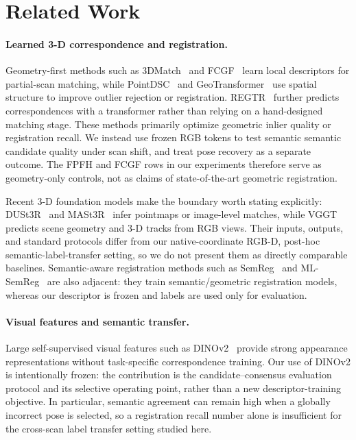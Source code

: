 \documentclass[10pt,twocolumn]{article}
\begin{document}
\section{Related Work}

\paragraph{Learned 3-D correspondence and registration.}
Geometry-first methods such as 3DMatch~\cite{3dmatch} and FCGF~\cite{fcgf}
learn local descriptors for partial-scan matching, while PointDSC~\cite{pointdsc}
and GeoTransformer~\cite{geotransformer} use spatial structure to improve
outlier rejection or registration. REGTR~\cite{regtr} further predicts
correspondences with a transformer rather than relying on a hand-designed
matching stage. These methods primarily optimize geometric inlier quality or
registration recall. We instead use frozen RGB tokens to test semantic
semantic candidate quality under scan shift, and treat pose recovery as a separate
outcome. The FPFH and FCGF rows in our experiments therefore serve as
geometry-only controls, not as claims of state-of-the-art geometric
registration.

Recent 3-D foundation models make the boundary worth stating explicitly:
DUSt3R~\cite{dust3r} and MASt3R~\cite{mast3r} infer pointmaps or image-level
matches, while VGGT~\cite{vggt} predicts scene geometry and 3-D tracks from
RGB views. Their inputs, outputs, and standard protocols differ from our
native-coordinate RGB-D, post-hoc semantic-label-transfer setting, so we do
not present them as directly comparable baselines. Semantic-aware registration
methods such as SemReg~\cite{semreg} and ML-SemReg~\cite{mlsemreg} are also
adjacent: they train semantic/geometric registration models, whereas our
descriptor is frozen and labels are used only for evaluation.

\paragraph{Visual features and semantic transfer.}
Large self-supervised visual features such as DINOv2~\cite{dinov2} provide
strong appearance representations without task-specific correspondence
training. Our use of DINOv2 is intentionally frozen: the contribution is the
candidate--consensus evaluation protocol and its selective operating point,
rather than a new descriptor-training objective. In particular, semantic
agreement can remain high when a globally incorrect pose is selected, so a
registration recall number alone is insufficient for the cross-scan label
transfer setting studied here.
\end{document}
